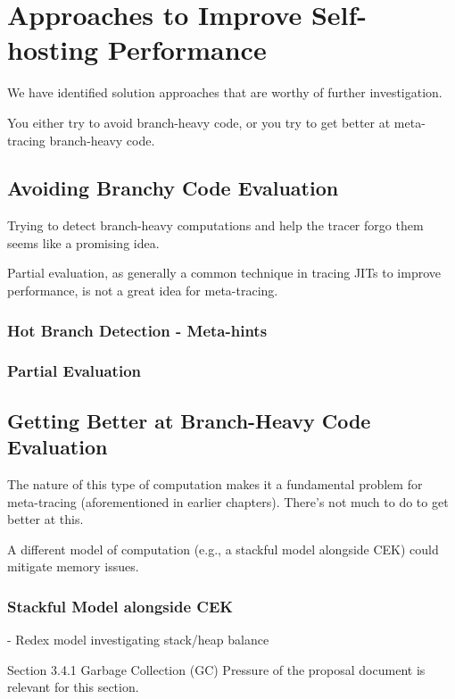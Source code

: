 \chapter{Approaches to Improve Self-hosting Performance}

	\label{chapter:solution}

	\begin{chaptersynopsis}
		We have identified solution approaches that are worthy of further investigation.

		You either try to avoid branch-heavy code, or you try to get better at meta-tracing branch-heavy code.
	\end{chaptersynopsis}

	\section{Avoiding Branchy Code Evaluation}
		\begin{mainpoint}
			Trying to detect branch-heavy computations and help the tracer forgo them seems like a promising idea.

			Partial evaluation, as generally a common technique in tracing JITs to improve performance, is not a great idea for meta-tracing.
		\end{mainpoint}
		\subsection{Hot Branch Detection - Meta-hints}
		\subsection{Partial Evaluation}

	\section{Getting Better at Branch-Heavy Code Evaluation}
		\begin{mainpoint}
			The nature of this type of computation makes it a fundamental problem for meta-tracing (aforementioned in earlier chapters). There's not much to do to get better at this.

			A different model of computation (e.g., a stackful model alongside CEK) could mitigate memory issues.
		\end{mainpoint}

		\subsection{Stackful Model alongside CEK}
		- Redex model investigating stack/heap balance

		\begin{todo}[Import]
			Section 3.4.1 Garbage Collection (GC) Pressure of the proposal document is relevant for this section.
		\end{todo}
